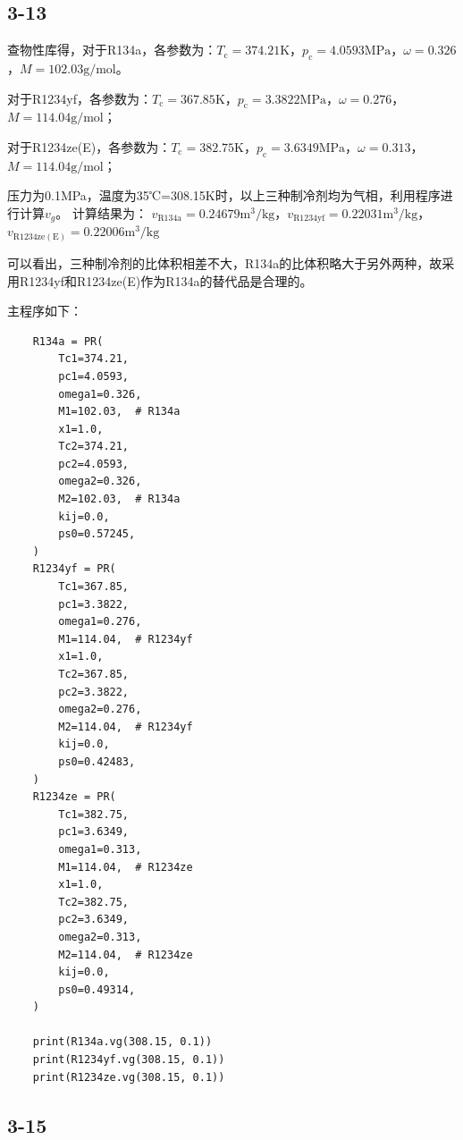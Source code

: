 \documentclass[12pt,a4paper]{article}
\begin{document}

\subsection*{3-13}
查物性库得，对于R134a，各参数为：$T_\mathrm{c}=374.21\mathrm{K}$，$p_\mathrm{c}=4.0593\mathrm{MPa}$，$\omega=0.326$，$M=102.03\mathrm{g/mol}$。

对于R1234yf，各参数为：$T_\mathrm{c}=367.85\mathrm{K}$，$p_\mathrm{c}=3.3822\mathrm{MPa}$，$\omega=0.276$，$M=114.04\mathrm{g/mol}$；

对于R1234ze(E)，各参数为：$T_\mathrm{c}=382.75\mathrm{K}$，$p_\mathrm{c}=3.6349\mathrm{MPa}$，$\omega=0.313$，$M=114.04\mathrm{g/mol}$；

压力为0.1MPa，温度为35℃=308.15K时，以上三种制冷剂均为气相，利用程序进行计算$v_g$。
计算结果为：
$v_\mathrm{R134a}=0.24679\mathrm{m^3/kg}$，$v_\mathrm{R1234yf}=0.22031\mathrm{m^3/kg}$，$v_\mathrm{R1234ze(E)}=0.22006\mathrm{m^3/kg}$

可以看出，三种制冷剂的比体积相差不大，R134a的比体积略大于另外两种，故采用R1234yf和R1234ze(E)作为R134a的替代品是合理的。

主程序如下：
\begin{lstlisting}
    R134a = PR(
        Tc1=374.21,
        pc1=4.0593,
        omega1=0.326,
        M1=102.03,  # R134a
        x1=1.0,
        Tc2=374.21,
        pc2=4.0593,
        omega2=0.326,
        M2=102.03,  # R134a
        kij=0.0,
        ps0=0.57245,
    )
    R1234yf = PR(
        Tc1=367.85,
        pc1=3.3822,
        omega1=0.276,
        M1=114.04,  # R1234yf
        x1=1.0,
        Tc2=367.85,
        pc2=3.3822,
        omega2=0.276,
        M2=114.04,  # R1234yf
        kij=0.0,
        ps0=0.42483,
    )
    R1234ze = PR(
        Tc1=382.75,
        pc1=3.6349,
        omega1=0.313,
        M1=114.04,  # R1234ze
        x1=1.0,
        Tc2=382.75,
        pc2=3.6349,
        omega2=0.313,
        M2=114.04,  # R1234ze
        kij=0.0,
        ps0=0.49314,
    )

    print(R134a.vg(308.15, 0.1))
    print(R1234yf.vg(308.15, 0.1))
    print(R1234ze.vg(308.15, 0.1))
\end{lstlisting}

\subsection*{3-15}
\end{document}
